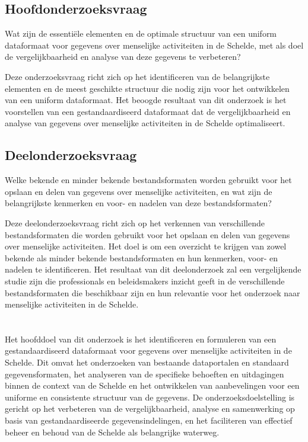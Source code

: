 \subsection{Hoofdonderzoeksvraag}
Wat zijn de essentiële elementen en de optimale structuur van een uniform dataformaat voor gegevens over menselijke activiteiten in de Schelde, met als doel de vergelijkbaarheid en analyse van deze gegevens te verbeteren?

Deze onderzoeksvraag richt zich op het identificeren van de belangrijkste elementen en de meest geschikte structuur die nodig zijn voor het ontwikkelen van een uniform dataformaat. Het beoogde resultaat van dit onderzoek is het voorstellen van een gestandaardiseerd dataformaat dat de vergelijkbaarheid en analyse van gegevens over menselijke activiteiten in de Schelde optimaliseert.

\subsection{Deelonderzoeksvraag}
Welke bekende en minder bekende bestandsformaten worden gebruikt voor het opslaan en delen van gegevens over menselijke activiteiten, en wat zijn de belangrijkste kenmerken en voor- en nadelen van deze bestandsformaten?

Deze deelonderzoeksvraag richt zich op het verkennen van verschillende bestandsformaten die worden gebruikt voor het opslaan en delen van gegevens over menselijke activiteiten. Het doel is om een overzicht te krijgen van zowel bekende als minder bekende bestandsformaten en hun kenmerken, voor- en nadelen te identificeren. Het resultaat van dit deelonderzoek zal een vergelijkende studie zijn die professionals en beleidsmakers inzicht geeft in de verschillende bestandsformaten die beschikbaar zijn en hun relevantie voor het onderzoek naar menselijke activiteiten in de Schelde.

\section{}%
\label{sec:onderzoeksdoelstelling}

Het hoofddoel van dit onderzoek is het identificeren en formuleren van een gestandaardiseerd dataformaat voor gegevens over menselijke activiteiten in de Schelde. Dit omvat het onderzoeken van bestaande dataportalen en standaard gegevensformaten, het analyseren van de specifieke behoeften en uitdagingen binnen de context van de Schelde en het ontwikkelen van aanbevelingen voor een uniforme en consistente structuur van de gegevens. De onderzoeksdoelstelling is gericht op het verbeteren van de vergelijkbaarheid, analyse en samenwerking op basis van gestandaardiseerde gegevensindelingen, en het faciliteren van effectief beheer en behoud van de Schelde als belangrijke waterweg.

